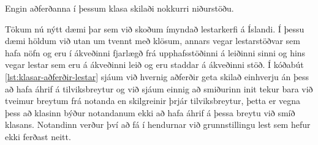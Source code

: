 Engin aðferðanna í þessum klasa skilaði nokkurri niðurstöðu.

Tökum nú nýtt dæmi þar sem við skoðum ímyndað lestarkerfi á Íslandi.
Í þessu dæmi höldum við utan um tvennt með klösum, annars vegar lestarstöðvar sem hafa nöfn og eru í ákveðinni fjarlægð frá upphafsstöðinni á leiðinni sinni og hins vegar lestar sem eru á ákveðinni leið og eru staddar á ákveðinni stöð.
Í kóðabút \ref{lst:klasar-aðferðir-lestar} sjáum við hvernig aðferðir geta skilað einhverju án þess að hafa áhrif á tilviksbreytur og við sjáum einnig að smiðurinn init tekur bara við tveimur breytum frá notanda en skilgreinir þrjár tilviksbreytur, þetta er vegna þess að klasinn býður notandanum ekki að hafa áhrif á þessa breytu við smíð klasans.
Notandinn verður því að fá í hendurnar við grunnstillingu lest sem hefur ekki ferðast neitt.


